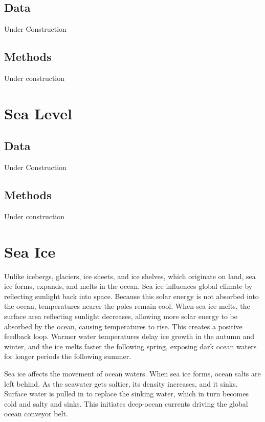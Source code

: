 \documentclass[
]{book}
\begin{document}
\hypertarget{data-9}{%
\section{Data}\label{data-9}}

Under Construction

\hypertarget{methods-9}{%
\section{Methods}\label{methods-9}}

Under construction

\hypertarget{sea-level}{%
\chapter{Sea Level}\label{sea-level}}

\hypertarget{data-10}{%
\section{Data}\label{data-10}}

Under Construction

\hypertarget{methods-10}{%
\section{Methods}\label{methods-10}}

Under construction

\hypertarget{sea-ice}{%
\chapter{Sea Ice}\label{sea-ice}}

Unlike icebergs, glaciers, ice sheets, and ice shelves, which originate on land, sea ice forms, expands, and melts in the ocean. Sea ice influences global climate by reflecting sunlight back into space. Because this solar energy is not absorbed into the ocean, temperatures nearer the poles remain cool. When sea ice melts, the surface area reflecting sunlight decreases, allowing more solar energy to be absorbed by the ocean, causing temperatures to rise. This creates a positive feedback loop. Warmer water temperatures delay ice growth in the autumn and winter, and the ice melts faster the following spring, exposing dark ocean waters for longer periods the following summer.

Sea ice affects the movement of ocean waters. When sea ice forms, ocean salts are left behind. As the seawater gets saltier, its density increases, and it sinks. Surface water is pulled in to replace the sinking water, which in turn becomes cold and salty and sinks. This initiates deep-ocean currents driving the global ocean conveyor belt.
\end{document}

